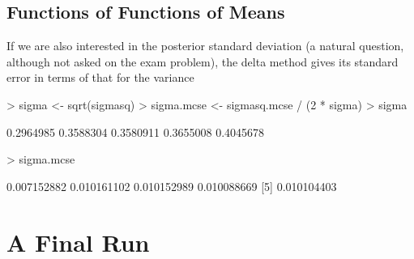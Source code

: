 \documentclass[12pt]{article}
\begin{document}
\subsection{Functions of Functions of Means}

If we are also interested in the posterior standard deviation
(a natural question, although not asked on the exam problem),
the delta method gives its standard error in terms of that
for the variance
\begin{Schunk}
\begin{Sinput}
> sigma <- sqrt(sigmasq)
> sigma.mcse <- sigmasq.mcse / (2 * sigma)
> sigma
\end{Sinput}
\begin{Soutput}
[1] 0.2964985 0.3588304 0.3580911 0.3655008 0.4045678
\end{Soutput}
\begin{Sinput}
> sigma.mcse
\end{Sinput}
\begin{Soutput}
[1] 0.007152882 0.010161102 0.010152989 0.010088669
[5] 0.010104403
\end{Soutput}
\end{Schunk}

\section{A Final Run}
\end{document}
